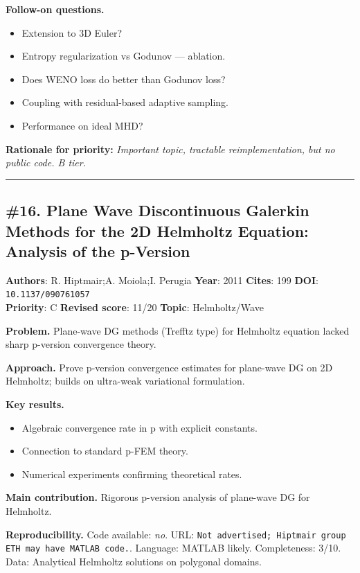 \documentclass[10pt,letterpaper]{article}
\begin{document}
\textbf{Follow-on questions.}
\begin{itemize}
\item Extension to 3D Euler?
\item Entropy regularization vs Godunov — ablation.
\item Does WENO loss do better than Godunov loss?
\item Coupling with residual-based adaptive sampling.
\item Performance on ideal MHD?
\end{itemize}

\textbf{Rationale for priority:} \emph{Important topic, tractable reimplementation, but no public code. B tier.}

\medskip\hrule\medskip

\subsection*{\#16. Plane Wave Discontinuous Galerkin Methods for the 2D Helmholtz Equation: Analysis of the p-Version}
\textbf{Authors}: R. Hiptmair;A. Moiola;I. Perugia \textbullet{} \textbf{Year}: 2011 \textbullet{} \textbf{Cites}: 199 \textbullet{} \textbf{DOI}: \texttt{10.1137/090761057} \\
\textbf{Priority}: C \textbullet{} \textbf{Revised score}: 11/20 \textbullet{} \textbf{Topic}: Helmholtz/Wave

\textbf{Problem.} Plane-wave DG methods (Trefftz type) for Helmholtz equation lacked sharp p-version convergence theory.

\textbf{Approach.} Prove p-version convergence estimates for plane-wave DG on 2D Helmholtz; builds on ultra-weak variational formulation.

\textbf{Key results.}
\begin{itemize}
\item Algebraic convergence rate in p with explicit constants.
\item Connection to standard p-FEM theory.
\item Numerical experiments confirming theoretical rates.
\end{itemize}

\textbf{Main contribution.} Rigorous p-version analysis of plane-wave DG for Helmholtz.

\textbf{Reproducibility.} Code available: \emph{no}. URL: \texttt{Not advertised; Hiptmair group ETH may have MATLAB code.}. Language: MATLAB likely. Completeness: 3/10. Data: Analytical Helmholtz solutions on polygonal domains.
\end{document}
